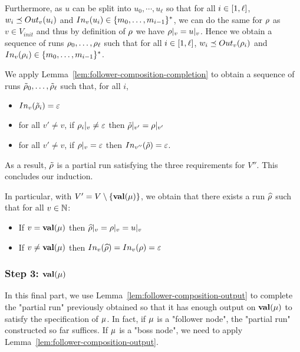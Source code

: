 Furthermore, as $u$ can be split into $u_0, \cdots, u_\ell$ so that for all $i \in \nset{1}{\ell}$, $w_i \subword \voutput{v}{u_i}$ and $\vinput{v}{u_i} \in \set{m_0, \ldots, m_{i-1}}^*$, we can do the same for $\run$ as $v \in V_{init}$ and thus by definition of $\run$ we have $\vproj{v}{\run} = \vproj{v}{u}$.
Hence we obtain a sequence of runs $\run_0, \ldots, \run_\ell$ such that for all $i \in \nset{1}{\ell}$, $w_i \subword \voutput{v}{\run_i}$ and $\vinput{v}{\run_i} \in \set{m_0, \ldots, m_{i-1}}^*$.

We apply Lemma~\ref{lem:follower-composition-completion} to obtain a sequence of runs $\Tilde{\run}_0, \ldots, \Tilde{\run}_\ell$ such that, for all $i$, 
\begin{itemize}	
	\item $\vinput{v}{\Tilde{\run}_i} = \varepsilon$ 
	
	\item for all $v' \neq v$, if $\vproj{v}{\run_i} \neq \varepsilon$ then $\vproj{v'}{\Tilde{\run}} = \vproj{v'}{\run}$
	
	\item for all $v' \neq v$, if $\vproj{v}{\run} = \varepsilon$ then $\vinput{v''}{\Tilde{\run}} = \varepsilon$.
\end{itemize}

As a result, $\Tilde{\run}$ is a partial run satisfying the three requirements for $V''$.  This concludes our induction.

	In particular, with $V' = V\setminus \set{\valuelabel{\node}}$, we obtain that there exists a run $\widehat{\run}$ such that 
for all $v \in \nats$:
\begin{itemize}
	\item If $v = \valuelabel{\node}$ then $\vproj{v}{\widehat{\run}} = \vproj{v}{\run} = \vproj{v}{u}$
	
	\item If $v \neq \valuelabel{\node}$ then $\vinput{v}{\widehat{\run}} = \vinput{v}{\run} = \epsilon$
\end{itemize}  

\subsubsection{Step 3: $\valuelabel{\node}$}

In this final part, we use Lemma~\ref{lem:follower-composition-output} to complete the "partial run" previously obtained so that it has enough output on $\valuelabel{\node}$ to satisfy the specification of $\node$. In fact, if $\node$ is a "follower node", the "partial run" constructed so far suffices. If $\node$ is a "boss node", we need to apply Lemma~\ref{lem:follower-composition-output}.
	
